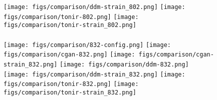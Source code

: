 \begin{figure}[!h]
\begin{graybox}
    \texttt{[image: figs/comparison/ddm-strain\_802.png]}\hspace{0.3cm}
    \texttt{[image: figs/comparison/tonir-802.png]}\hspace{0.06cm}
    \texttt{[image: figs/comparison/tonir-strain\_802.png]}
    \vspace{-1pt}
    \\
    \hspace{0.3cm}
    \hspace{0.06cm}
    \hspace{0.3cm}
    \hspace{0.06cm}
    \hspace{0.3cm}
    \hspace{0.06cm}
    \vspace{2pt}
    \\
    \texttt{[image: figs/comparison/832-config.png]}\hspace{0.3cm}
    \texttt{[image: figs/comparison/cgan-832.png]}\hspace{0.06cm}
    \texttt{[image: figs/comparison/cgan-strain\_832.png]}\hspace{0.3cm}
    \texttt{[image: figs/comparison/ddm-832.png]}\hspace{0.06cm}
    \texttt{[image: figs/comparison/ddm-strain\_832.png]}\hspace{0.3cm}
    \texttt{[image: figs/comparison/tonir-832.png]}\hspace{0.06cm}
    \texttt{[image: figs/comparison/tonir-strain\_832.png]}
    \vspace{-1pt}
    \\
    \hspace{0.3cm}
    \hspace{0.06cm}
    \hspace{0.3cm}
    \hspace{0.06cm}
    \hspace{0.3cm}
    \hspace{0.06cm}

\end{graybox}
\end{figure}
